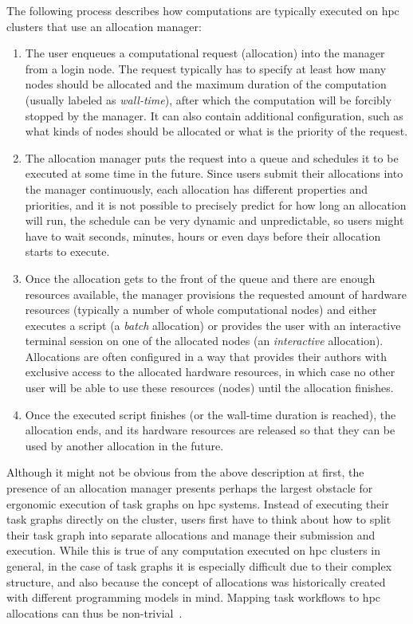 The following process describes how computations are typically executed on
\gls{hpc} clusters that use an allocation manager:

\begin{enumerate}
	\item The user enqueues a computational request (allocation) into the manager from a login node. The
	      request typically has to specify at least how many nodes should be allocated and the maximum
	      duration of the computation (usually labeled as \emph{wall-time}), after which the
	      computation will be forcibly stopped by the manager. It can also contain additional configuration,
	      such as what kinds of nodes should be allocated or what is the priority of the request.
	\item The allocation manager puts the request into a queue and schedules it to be executed at some time
	      in the future. Since users submit their allocations into the manager continuously, each allocation
	      has different properties and priorities, and it is not possible to precisely predict for how long
	      an allocation will run, the schedule can be very dynamic and unpredictable, so users might have to
	      wait seconds, minutes, hours or even days before their allocation starts to execute.
	\item Once the allocation gets to the front of the queue and there are enough resources available, the
	      manager provisions the requested amount of hardware resources (typically a number of whole
	      computational nodes) and either executes a script (a \emph{batch} allocation) or
	      provides the user with an interactive terminal session on one of the allocated nodes (an
	      \emph{interactive} allocation). Allocations are often configured in a way that provides
	      their authors with exclusive access to the allocated hardware resources, in which case no other
	      user will be able to use these resources (nodes) until the allocation finishes.
	\item Once the executed script finishes (or the wall-time duration is reached), the allocation ends, and
	      its hardware resources are released so that they can be used by another allocation in the future.
\end{enumerate}

Although it might not be obvious from the above description at first, the presence of an allocation
manager presents perhaps the largest obstacle for ergonomic execution of task graphs on
\gls{hpc} systems. Instead of executing their task graphs directly on the cluster, users first have to
think about how to split their task graph into separate allocations and manage their submission and execution.
While this is true of any computation executed on \gls{hpc} clusters in general, in the case of task
graphs it is especially difficult due to their complex structure, and also because the concept of allocations
was historically created with different programming models in mind. Mapping task workflows to \gls{hpc}
allocations can thus be non-trivial~\cite{glume,slurm-workflow}.

